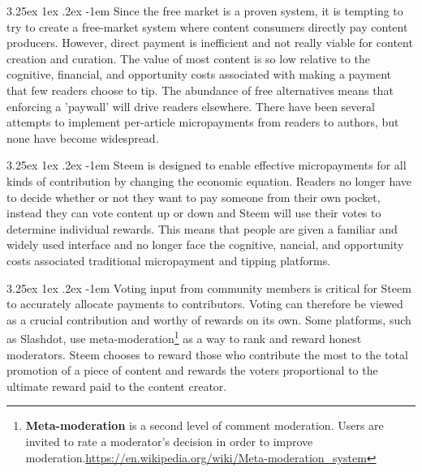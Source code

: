 \documentclass{article}
\makeatletter
\renewcommand\paragraph{\@startsection{paragraph}{5}{\z@}%
  {3.25ex \@plus1ex \@minus.2ex}%
  {-1em}%
  {\normalfont\normalsize\bfseries}}
\makeatother
\begin{document}
            \paragraph{}
                Since the free market is a proven system, it is tempting to try to create a free-market system where content consumers directly pay content producers. However, direct payment is inefficient and not really viable for content creation and curation. The value of most content is so low relative to the cognitive, financial, and opportunity costs associated with making a payment that few readers choose to tip. The abundance of free alternatives means that enforcing a 'paywall' will drive readers elsewhere. There have been several attempts to implement per-article micropayments from readers to authors, but none have become widespread.

            \paragraph{}
                Steem is designed to enable effective micropayments for all kinds of contribution by changing the economic equation. Readers no longer have to decide whether or not they want to pay someone from their own pocket, instead they can vote content up or down and Steem will use their votes to determine individual rewards. This means that people are given a familiar and widely used interface and no longer face the cognitive,  nancial, and opportunity costs associated traditional micropayment and tipping platforms.

            \paragraph{}
                Voting input from community members is critical for Steem to accurately allocate payments to contributors. Voting can therefore be viewed as a crucial contribution and worthy of rewards on its own. Some platforms, such as Slashdot, use meta-moderation\footnote{\textbf{Meta-moderation} is a second level of comment moderation. Users are invited to rate a moderator's decision in order to improve moderation.\newline\url{https://en.wikipedia.org/wiki/Meta-moderation_system}} as a way to rank and reward honest moderators. Steem chooses to reward those who contribute the most to the total promotion of a piece of content and rewards the voters proportional to the ultimate reward paid to the content creator.
\end{document}
